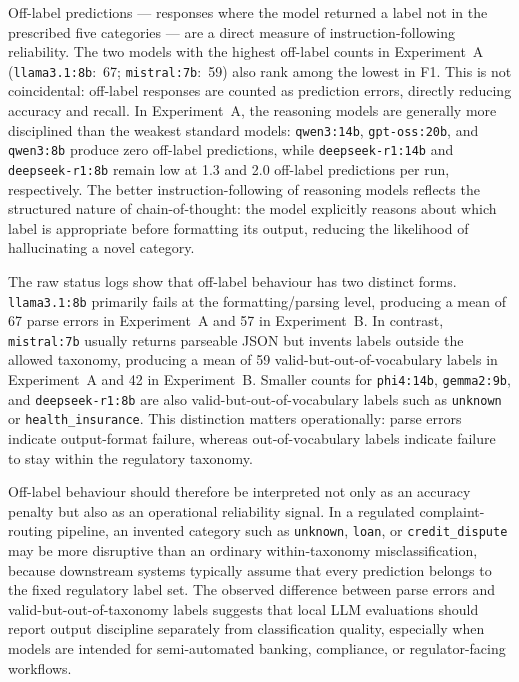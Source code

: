 \documentclass[a4paper,fleqn]{cas-dc}
\begin{document}
Off-label predictions --- responses where the model returned a label
not in the prescribed five categories --- are a direct measure of
instruction-following reliability. The two models with the highest
off-label counts in Experiment~A
(\texttt{llama3.1:8b}:~67; \texttt{mistral:7b}:~59)
also rank among the lowest in F1. This is
not coincidental: off-label responses are counted as prediction
errors, directly reducing accuracy and recall. In Experiment~A, the
reasoning models are generally more disciplined than the weakest
standard models: \texttt{qwen3:14b}, \texttt{gpt-oss:20b}, and
\texttt{qwen3:8b} produce zero off-label predictions, while
\texttt{deepseek-r1:14b} and \texttt{deepseek-r1:8b} remain low at
1.3 and 2.0 off-label predictions per run, respectively.
The better instruction-following of reasoning models reflects the
structured nature of chain-of-thought: the model explicitly reasons
about which label is appropriate before formatting its output,
reducing the likelihood of hallucinating a novel category.

The raw status logs show that off-label behaviour has two distinct
forms. \texttt{llama3.1:8b} primarily fails at the formatting/parsing
level, producing a mean of 67 parse errors in Experiment~A and 57 in
Experiment~B. In contrast, \texttt{mistral:7b} usually returns
parseable JSON but invents labels outside the allowed taxonomy,
producing a mean of 59 valid-but-out-of-vocabulary labels in
Experiment~A and 42 in Experiment~B. Smaller counts for \texttt{phi4:14b},
\texttt{gemma2:9b}, and \texttt{deepseek-r1:8b} are also
valid-but-out-of-vocabulary labels such as \texttt{unknown} or
\texttt{health\_insurance}. This distinction matters operationally:
parse errors indicate output-format failure, whereas out-of-vocabulary
labels indicate failure to stay within the regulatory taxonomy.

Off-label behaviour should therefore be interpreted not only as an
accuracy penalty but also as an operational reliability signal. In a
regulated complaint-routing pipeline, an invented category such as
\texttt{unknown}, \texttt{loan}, or \texttt{credit\_dispute} may be
more disruptive than an ordinary within-taxonomy misclassification,
because downstream systems typically assume that every prediction
belongs to the fixed regulatory label set. The observed difference
between parse errors and valid-but-out-of-taxonomy labels suggests
that local LLM evaluations should report output discipline separately
from classification quality, especially when models are intended for
semi-automated banking, compliance, or regulator-facing workflows.
\end{document}

